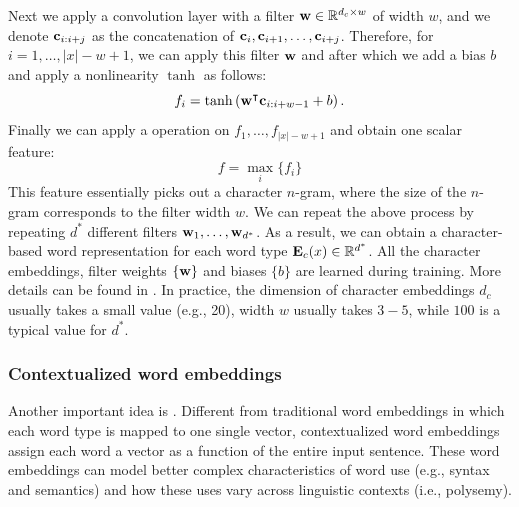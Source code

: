Next we apply a convolution layer with a filter $\mathbf{w} \in \mathbb{R}^{d_c \times w}$ of width $w$, and we denote $\mathbf{c}_{i:i+j}$ as the concatenation of $\mathbf{c}_i, \mathbf{c}_{i + 1}, \ldots, \mathbf{c}_{i + j}$. Therefore, for $i = 1, \ldots, |x| - w + 1$, we can apply this filter $\mathbf{w}$ and after which we add a bias $b$ and apply a nonlinearity $\tanh$ as follows:
\begin{equation}
    f_i = \tanh\left(\mathbf{w}^{\intercal} \mathbf{c}_{i:i+w-1} + b \right).
\end{equation}
Finally we can apply a  operation on $f_1, \ldots, f_{|x| - w + 1}$ and obtain one scalar feature:
\begin{equation}
    f = \max_{i}{\{f_i\}}
\end{equation}
This feature essentially picks out a character $n$-gram, where the size of the $n$-gram corresponds to the filter width $w$. We can repeat the above process by repeating $d^*$ different filters $\mathbf{w}_1, \ldots, \mathbf{w}_{d^*}$. As a result, we can obtain a character-based word representation for each word type $\mathbf{E}_c(x) \in \mathbb{R}^{d^*}$. All the character embeddings, filter weights $\{\mathbf{w}\}$ and biases $\{b\}$ are learned during training. More details can be found in .  In practice, the dimension of character embeddings $d_c$ usually takes a small value (e.g., 20), width $w$ usually takes $3 - 5$, while $100$ is a typical value for $d^*$.

\subsubsection*{Contextualized word embeddings}
Another important idea is . Different from traditional word embeddings in which each word type is mapped to one single vector, contextualized word embeddings assign each word a vector as a function of the entire input sentence. These word embeddings can model better complex characteristics of word use (e.g., syntax and semantics) and how these uses vary across linguistic contexts (i.e., polysemy).

